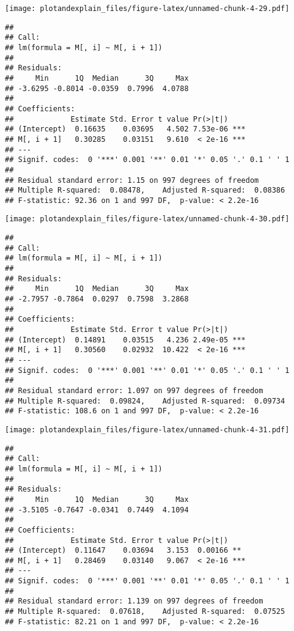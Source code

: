 \documentclass[]{article}
\begin{document}
\texttt{[image: plotandexplain\_files/figure-latex/unnamed-chunk-4-29.pdf]}

\begin{verbatim}
## 
## Call:
## lm(formula = M[, i] ~ M[, i + 1])
## 
## Residuals:
##     Min      1Q  Median      3Q     Max 
## -3.6295 -0.8014 -0.0359  0.7996  4.0788 
## 
## Coefficients:
##             Estimate Std. Error t value Pr(>|t|)    
## (Intercept)  0.16635    0.03695   4.502 7.53e-06 ***
## M[, i + 1]   0.30285    0.03151   9.610  < 2e-16 ***
## ---
## Signif. codes:  0 '***' 0.001 '**' 0.01 '*' 0.05 '.' 0.1 ' ' 1
## 
## Residual standard error: 1.15 on 997 degrees of freedom
## Multiple R-squared:  0.08478,    Adjusted R-squared:  0.08386 
## F-statistic: 92.36 on 1 and 997 DF,  p-value: < 2.2e-16
\end{verbatim}

\texttt{[image: plotandexplain\_files/figure-latex/unnamed-chunk-4-30.pdf]}

\begin{verbatim}
## 
## Call:
## lm(formula = M[, i] ~ M[, i + 1])
## 
## Residuals:
##     Min      1Q  Median      3Q     Max 
## -2.7957 -0.7864  0.0297  0.7598  3.2868 
## 
## Coefficients:
##             Estimate Std. Error t value Pr(>|t|)    
## (Intercept)  0.14891    0.03515   4.236 2.49e-05 ***
## M[, i + 1]   0.30560    0.02932  10.422  < 2e-16 ***
## ---
## Signif. codes:  0 '***' 0.001 '**' 0.01 '*' 0.05 '.' 0.1 ' ' 1
## 
## Residual standard error: 1.097 on 997 degrees of freedom
## Multiple R-squared:  0.09824,    Adjusted R-squared:  0.09734 
## F-statistic: 108.6 on 1 and 997 DF,  p-value: < 2.2e-16
\end{verbatim}

\texttt{[image: plotandexplain\_files/figure-latex/unnamed-chunk-4-31.pdf]}

\begin{verbatim}
## 
## Call:
## lm(formula = M[, i] ~ M[, i + 1])
## 
## Residuals:
##     Min      1Q  Median      3Q     Max 
## -3.5105 -0.7647 -0.0341  0.7449  4.1094 
## 
## Coefficients:
##             Estimate Std. Error t value Pr(>|t|)    
## (Intercept)  0.11647    0.03694   3.153  0.00166 ** 
## M[, i + 1]   0.28469    0.03140   9.067  < 2e-16 ***
## ---
## Signif. codes:  0 '***' 0.001 '**' 0.01 '*' 0.05 '.' 0.1 ' ' 1
## 
## Residual standard error: 1.139 on 997 degrees of freedom
## Multiple R-squared:  0.07618,    Adjusted R-squared:  0.07525 
## F-statistic: 82.21 on 1 and 997 DF,  p-value: < 2.2e-16
\end{verbatim}
\end{document}
